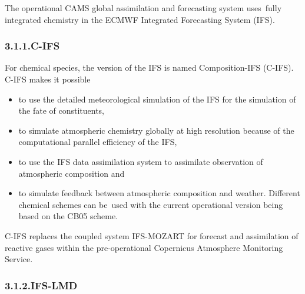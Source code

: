 \documentclass[9pt]{report}
\begin{document}
\noindent{}The operational CAMS global assimilation and forecasting system uses fully integrated chemistry in the ECMWF Integrated Forecasting System (IFS).%

\subsubsection{3.1.1.\hspace*{0.5em}C-IFS}\label{sec-c-ifs}%

\noindent{}For chemical species, the version of the IFS is named Composition-IFS (C-IFS). C-IFS makes it possible%

\begin{itemize}%

\item{}
to use the detailed meteorological simulation of the IFS for the simulation of the fate of constituents,%

\item{}
to simulate atmospheric chemistry globally at high resolution because of the computational parallel efficiency of the IFS,%

\item{}
to use the IFS data assimilation system to assimilate observation of atmospheric composition and%

\item{}
to simulate feedback between atmospheric composition and weather. Different chemical schemes can be used with the current operational version being based on the CB05 scheme.%
\end{itemize}%

\noindent{}C-IFS  replaces the coupled system IFS-MOZART for forecast and assimilation of reactive gases within the pre-operational Copernicus Atmosphere Monitoring Service.%

\subsubsection{3.1.2.\hspace*{0.5em}IFS-LMD}\label{sec-ifs-lmd}%
\end{document}
